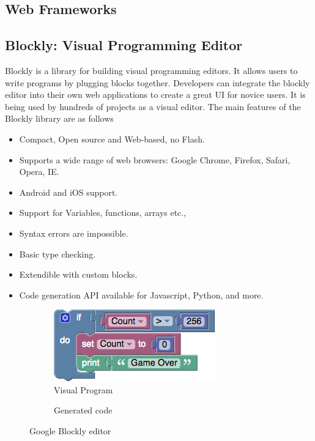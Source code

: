 \subsection{Web Frameworks}

\subsection{Blockly: Visual Programming Editor}
Blockly \cite{Blockly} is a library for building visual programming editors. It allows users to write programs by plugging blocks together. Developers can integrate the blockly editor into their own web applications to create a great UI for novice users. It is being used by hundreds of projects as a visual editor. The main features of the Blockly library are as follows

\begin{itemize}
\item Compact, Open source and Web-based, no Flash.
\item Supports a wide range of web browsers: Google Chrome, Firefox, Safari, Opera, IE.
\item Android and iOS support.
\item Support for Variables, functions, arrays etc.,
\item Syntax errors are impossible.
\item Basic type checking.
\item Extendible with custom blocks.
\item Code generation API available for Javascript, Python, and more.
\end{itemize}

\begin{figure}[H]
\begin{subfigure}[h]{0.48\textwidth}
\includegraphics[width=\textwidth]{assets/blockly_sample.png}
\caption[Visual Program]{Visual Program}
\label{fig:blockly_sample}
\end{subfigure}
\hfill
\begin{subfigure}[h]{0.48\textwidth}

\caption[Generated code]{Generated code}
\label{fig:blockly_sample_code}
\end{subfigure}
\caption[Google Blockly editor]{Google Blockly editor}
\label{fig:pseudo_nodes}
\end{figure}

